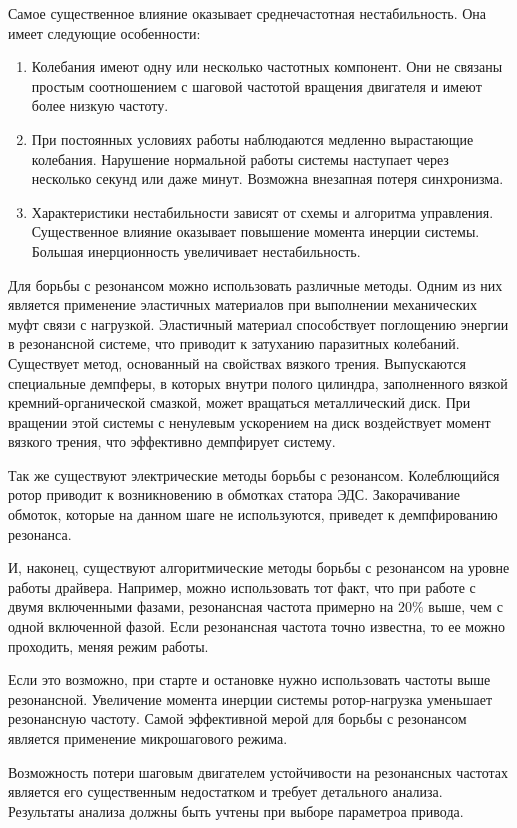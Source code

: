 Самое существенное влияние оказывает среднечастотная нестабильность. Она имеет следующие особенности:
\begin{enumerate}
    \item Колебания имеют одну или несколько частотных компонент. Они не связаны простым соотношением с
            шаговой частотой вращения двигателя и имеют более низкую частоту.

    \item При постоянных условиях работы наблюдаются медленно вырастающие колебания.
            Нарушение нормальной работы системы наступает через несколько секунд или даже минут.
            Возможна внезапная потеря синхронизма.

    \item Характеристики нестабильности зависят от схемы и алгоритма управления.
            Существенное влияние оказывает повышение момента инерции системы.
            Большая инерционность увеличивает нестабильность.
\end{enumerate}

Для борьбы с резонансом можно использовать различные методы. Одним из них является применение
эластичных материалов при выполнении механических муфт связи с нагрузкой. Эластичный материал
способствует поглощению энергии в резонансной системе, что приводит к затуханию паразитных колебаний.
Существует метод, основанный на свойствах вязкого трения. Выпускаются специальные демпферы, в которых
внутри полого цилиндра, заполненного вязкой кремний-органической смазкой, может вращаться
металлический диск. При вращении этой системы с ненулевым ускорением на диск воздействует момент вязкого
трения, что эффективно демпфирует систему.

Так же существуют электрические методы борьбы с резонансом. Колеблющийся ротор приводит к возникновению в
обмотках статора ЭДС. Закорачивание обмоток, которые на данном шаге не используются, приведет к
демпфированию резонанса.

И, наконец, существуют алгоритмические методы борьбы с резонансом на уровне работы драйвера. Например,
можно использовать тот факт, что при работе с двумя включенными фазами, резонансная частота примерно
на $20\%$ выше, чем с одной включенной фазой. Если резонансная частота точно известна, то ее можно
проходить, меняя режим работы.

Если это возможно, при старте и остановке нужно использовать частоты выше резонансной. Увеличение
момента инерции системы ротор-нагрузка уменьшает резонансную частоту.
Самой эффективной мерой для борьбы с резонансом является применение микрошагового режима.

Возможность потери шаговым двигателем устойчивости на резонансных частотах является его существенным
недостатком и требует детального анализа. Результаты анализа должны быть учтены при выборе
параметроа привода.
